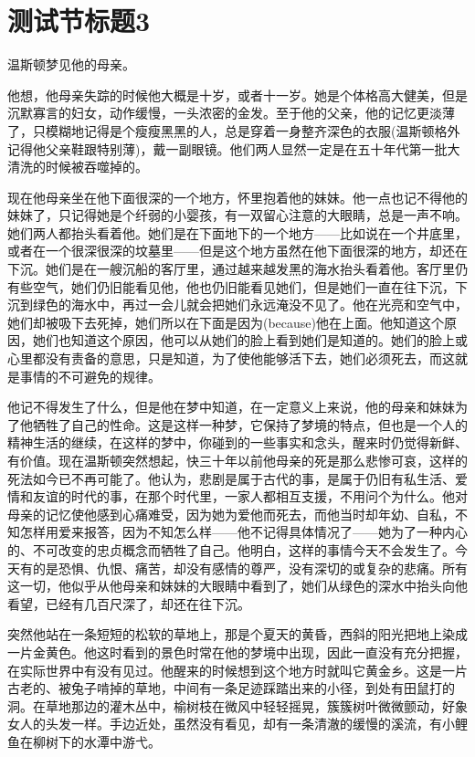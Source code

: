 \section{测试节标题3}

温斯顿梦见他的母亲。


他想，他母亲失踪的时候他大概是十岁，或者十一岁。她是个体格高大健美，但是沉默寡言的妇女，动作缓慢，一头浓密的金发。至于他的父亲，他的记忆更淡薄了，只模糊地记得是个瘦瘦黑黑的人，总是穿着一身整齐深色的衣服(温斯顿格外记得他父亲鞋跟特别薄)，戴一副眼镜。他们两人显然一定是在五十年代第一批大清洗的时候被吞噬掉的。


现在他母亲坐在他下面很深的一个地方，怀里抱着他的妹妹。他一点也记不得他的妹妹了，只记得她是个纤弱的小婴孩，有一双留心注意的大眼睛，总是一声不响。她们两人都抬头看着他。她们是在下面地下的一个地方——比如说在一个井底里，或者在一个很深很深的坟墓里——但是这个地方虽然在他下面很深的地方，却还在下沉。她们是在一艘沉船的客厅里，通过越来越发黑的海水抬头看着他。客厅里仍有些空气，她们仍旧能看见他，他也仍旧能看见她们，但是她们一直在往下沉，下沉到绿色的海水中，再过一会儿就会把她们永远淹没不见了。他在光亮和空气中，她们却被吸下去死掉，她们所以在下面是因为(because)他在上面。他知道这个原因，她们也知道这个原因，他可以从她们的脸上看到她们是知道的。她们的脸上或心里都没有责备的意思，只是知道，为了使他能够活下去，她们必须死去，而这就是事情的不可避免的规律。


他记不得发生了什么，但是他在梦中知道，在一定意义上来说，他的母亲和妹妹为了他牺牲了自己的性命。这是这样一种梦，它保持了梦境的特点，但也是一个人的精神生活的继续，在这样的梦中，你碰到的一些事实和念头，醒来时仍觉得新鲜、有价值。现在温斯顿突然想起，快三十年以前他母亲的死是那么悲惨可哀，这样的死法如今已不再可能了。他认为，悲剧是属于古代的事，是属于仍旧有私生活、爱情和友谊的时代的事，在那个时代里，一家人都相互支援，不用问个为什么。他对母亲的记忆使他感到心痛难受，因为她为爱他而死去，而他当时却年幼、自私，不知怎样用爱来报答，因为不知怎么样——他不记得具体情况了——她为了一种内心的、不可改变的忠贞概念而牺牲了自己。他明白，这样的事情今天不会发生了。今天有的是恐惧、仇恨、痛苦，却没有感情的尊严，没有深切的或复杂的悲痛。所有这一切，他似乎从他母亲和妹妹的大眼睛中看到了，她们从绿色的深水中抬头向他看望，已经有几百尺深了，却还在往下沉。


突然他站在一条短短的松软的草地上，那是个夏天的黄昏，西斜的阳光把地上染成一片金黄色。他这时看到的景色时常在他的梦境中出现，因此一直没有充分把握，在实际世界中有没有见过。他醒来的时候想到这个地方时就叫它黄金乡。这是一片古老的、被兔子啃掉的草地，中间有一条足迹踩踏出来的小径，到处有田鼠打的洞。在草地那边的灌木丛中，榆树枝在微风中轻轻摇晃，簇簇树叶微微颤动，好象女人的头发一样。手边近处，虽然没有看见，却有一条清澈的缓慢的溪流，有小鲤鱼在柳树下的水潭中游弋。


